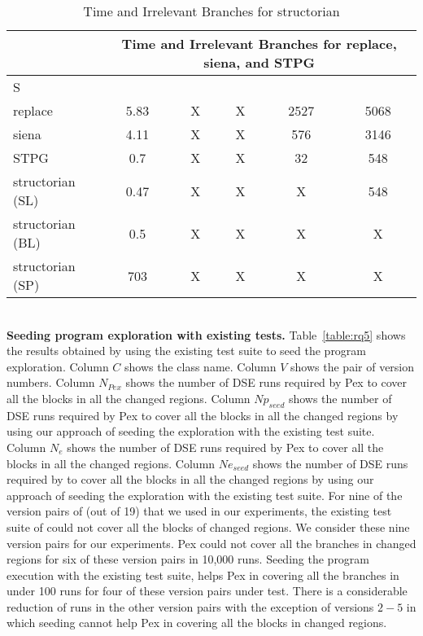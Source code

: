 \begin{table}
\begin{CodeOut}
\begin{center}
\caption {\label{table:all_time}Time and Irrelevant Branches for structorian}
\begin {tabular} {|l|c|c|c|c|c|}
\hline
&\multicolumn{5}{|c|}{Time and Irrelevant Branches for replace, siena, and STPG}\\ 
\hline
S &\CenterCell{$T_{static}(s)$}&\CenterCell{$T_{Pex}(s)$}&\CenterCell{$T_{eXp}(s)$} &\CenterCell{$B_{Irr}$}&\CenterCell{$B_{Tot}$}\\
\hline
replace&5.83&X&X&2527&5068\\
\hline
siena&4.11&X&X&576&3146\\
\hline
STPG&0.7&X&X&32&548\\
\hline
structorian (SL)&0.47&X&X&X&548\\
\hline
structorian (BL)&0.5&X&X&X&X\\
\hline
structorian (SP)&703&X&X&X&X\\
\hline

\end{tabular}
\end{center}
\end{CodeOut}
\end{table}
\\ \textbf{Seeding program exploration with existing tests.} Table~\ref{table:rq5} shows the results obtained by using the existing test suite to seed the program exploration. Column $C$ shows the class name. Column $V$ shows the pair of version numbers. Column $N_{Pex}$ shows the number of DSE runs required by Pex to cover all the blocks in all the changed regions. Column $Np_{seed}$ shows the number of DSE runs required by Pex to cover all the blocks in all the changed regions by using our approach of seeding the exploration with the existing test suite. Column $N_{e}$ shows the number of DSE runs required by Pex to cover all the blocks in all the changed regions. Column $Ne_{seed}$ shows the number of DSE runs required by  to cover all the blocks in all the changed regions by using our approach of seeding the exploration with the existing test suite.
For nine of the version pairs of  (out of 19) that we used in our experiments, the existing test suite of  could not cover all the blocks of changed regions. We consider these nine version pairs for our experiments.
Pex could not cover all the branches in changed regions for six of these version pairs in 10,000 runs. Seeding the program execution with the existing test suite, helps Pex in covering all the branches in under 100 runs for four of these version pairs under test. There is a considerable reduction of runs in the other version pairs with the exception of versions $2-5$ in which seeding cannot help Pex in covering all the blocks in changed regions. 

